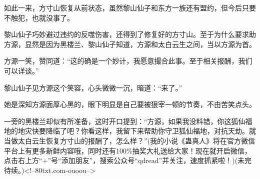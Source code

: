\begin{this_body}
如此一来，方寸山恢复从前状态，虽然黎山仙子和东方一族还有盟约，但今后只要不触犯，也就没事了。

黎山仙子巧妙避过违约的反噬伤害，还得到了修复好的方寸山。至于为什么要求助方源，显然是因为黑楼兰、黎山仙子知道，方源和太白云生之间，当以方源为首。

方源一笑，赞同道：“这的确是一个妙计，我愿意撮合此事。至于相关报酬，我们可以详谈。”

黎山仙子见方源这个笑容，心头微微一沉，暗道：“来了。”

她是深知方源面厚心黑的，眼下明显是自己要被狠宰一顿的节奏，不由苦笑点头。

一旁的黑楼兰却似有所准备，这时开口提到：“方源，如果我没料错，你这狐仙福地的地灾快要降临了吧？你看这样，我留下来帮助你守卫狐仙福地，对抗天劫。就当做太白云生恢复方寸山的报酬了，怎么样？”(我的小说《蛊真人》将在官方微信平台上有更多新鲜内容哦，同时还有100\%抽奖大礼送给大家！现在就开启微信，点击右上方“+”号“添加朋友”，搜索公众号“qdread”并关注，速度抓紧啦！)(未完待续。)<!--80txt.com-ouoou-->

\end{this_body}

